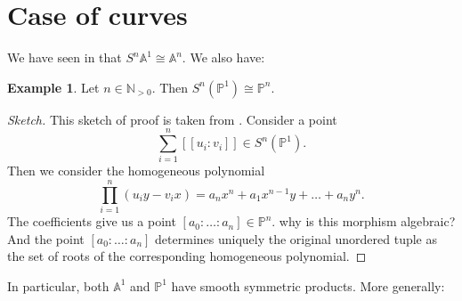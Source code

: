 \documentclass[12pt,a4paper]{amsart}
\theoremstyle{plain}
\theoremstyle{definition}
\newtheorem{exmp}[thm]{Example}
\theoremstyle{remark}
\begin{document}
\section{Case of curves}

We have seen in  that $S^{n}\mathbb{A}^{1} \cong \mathbb{A}^{n}$.
We also have:

\begin{exmp}\label{exmp:projectiveline}
  Let $n \in \mathbb{N}_{>0}$.
  Then $S^{n}(\mathbb{P}^{1}) \cong \mathbb{P}^{n}$.

  \begin{proof}[Sketch]
    This sketch of proof is taken from \cite[Example 3.4]{rot16}.
    Consider a point
    \[ \sum_{i = 1}^{n} [[u_{i}:v_{i}]] \in S^{n}(\mathbb{P}^{1}). \]
    Then we consider the homogeneous polynomial
    \[ \prod_{i = 1}^{n} (u_{i}y - v_{i}x) = a_{n} x^{n} + a_{1} x^{n-1}y + \ldots + a_{n}y^{n}. \]
    The coefficients give us a point $[a_{0} : \ldots : a_{n} ] \in \mathbb{P}^{n}$.
    \color{red} why is this morphism algebraic? \color{black}
    And the point $[a_{0} : \ldots : a_{n}]$ determines uniquely the original unordered tuple as the set of roots of the corresponding homogeneous polynomial.
  \end{proof}
\end{exmp}

In particular, both $\mathbb{A}^{1}$ and $\mathbb{P}^{1}$ have smooth symmetric products.
More generally:
\end{document}
